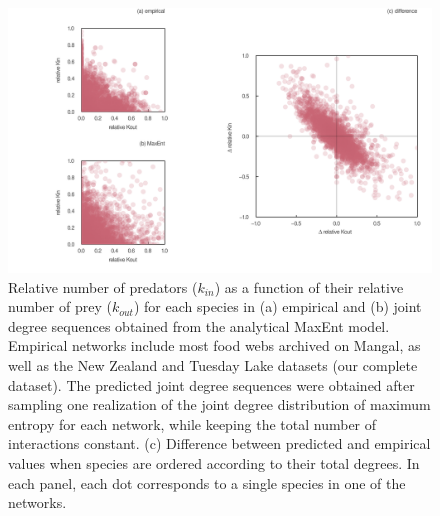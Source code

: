 \documentclass[11pt]{article}
\makeatletter
\def\maxwidth{\ifdim\Gin@nat@width>\linewidth\linewidth
\else\Gin@nat@width\fi}
\let\Oldincludegraphics\includegraphics
\renewcommand{\includegraphics}[1]{\Oldincludegraphics[width=\maxwidth]{#1}}
\makeatother
\begin{document}
\begin{figure}
\hypertarget{fig:joint_dd}{%
\centering
\includegraphics{figures/joint_degree_dist.png}
\caption{Relative number of predators (\(k_{in}\)) as a function of
their relative number of prey (\(k_{out}\)) for each species in (a)
empirical and (b) joint degree sequences obtained from the analytical
MaxEnt model. Empirical networks include most food webs archived on
Mangal, as well as the New Zealand and Tuesday Lake datasets (our
complete dataset). The predicted joint degree sequences were obtained
after sampling one realization of the joint degree distribution of
maximum entropy for each network, while keeping the total number of
interactions constant. (c) Difference between predicted and empirical
values when species are ordered according to their total degrees. In
each panel, each dot corresponds to a single species in one of the
networks.}\label{fig:joint_dd}
}
\end{figure}
\end{document}
